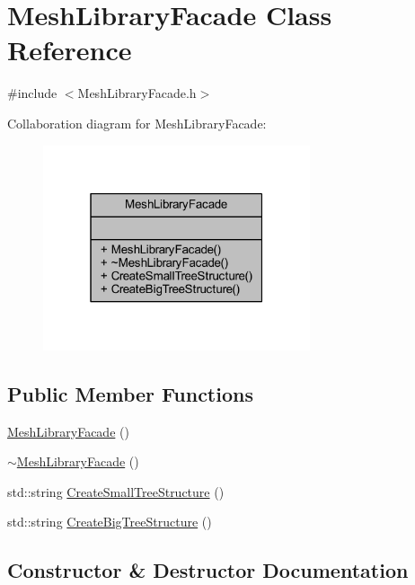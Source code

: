 \hypertarget{class_mesh_library_facade}{}\section{Mesh\+Library\+Facade Class Reference}
\label{class_mesh_library_facade}


{\ttfamily \#include $<$Mesh\+Library\+Facade.\+h$>$}



Collaboration diagram for Mesh\+Library\+Facade\+:\nopagebreak
\begin{figure}[H]
\begin{center}
\leavevmode
\includegraphics[width=223pt]{class_mesh_library_facade__coll__graph}
\end{center}
\end{figure}
\subsection*{Public Member Functions}
\begin{DoxyCompactItemize}
\item 
\mbox{\hyperlink{class_mesh_library_facade_aa1847261029ac07a348fc4395814405b}{Mesh\+Library\+Facade}} ()
\item 
\mbox{\hyperlink{class_mesh_library_facade_a78a45bb4fecd4d49f578d512757012a5}{$\sim$\+Mesh\+Library\+Facade}} ()
\item 
std\+::string \mbox{\hyperlink{class_mesh_library_facade_ac17887d31ee505066651081d0613660e}{Create\+Small\+Tree\+Structure}} ()
\item 
std\+::string \mbox{\hyperlink{class_mesh_library_facade_a72fec109c899a1491a1f142402123787}{Create\+Big\+Tree\+Structure}} ()
\end{DoxyCompactItemize}


\subsection{Constructor \& Destructor Documentation}
\mbox{\label{class_mesh_library_facade_aa1847261029ac07a348fc4395814405b}} 
